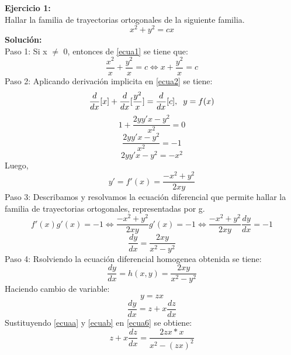 \documentclass[12pt,letterpaper]{article}
\begin{document}
\begin{titlepage}
\begin{flushleft}
\textbf{Ejercicio 1:} \\
\vspace{0.5cm}
Hallar la familia de trayectorias ortogonales de la siguiente familia. 
\begin{equation} \tag{1} \label{ecua1}
x^{2} + y^{2} = cx
\end{equation}
\textbf{Solución:} \\
\vspace{0.5cm}
 Paso 1: Si x $\neq$ 0, entonces de \eqref{ecua1} se tiene que:
\begin{equation} \tag{2} \label{ecua2}
\frac{x^{2}}{x} + \frac{y^{2}}{x} = c \Leftrightarrow x + \frac{y^{2}}{x} = c
\end{equation}
Paso 2: Aplicando derivación implicita en \eqref{ecua2} se tiene:
\begin{equation*} 
\dfrac{d}{dx} [x] + \dfrac{d}{dx} [\frac{y^{2}}{x}] = \dfrac{d}{dx} [c],\hspace{0.2cm} y = f(x)
\end{equation*}
\begin{equation*} 
1 + \frac{2yy'x - y^{2}}{x^{2}} = 0
\end{equation*}
\begin{equation*} 
 \frac{2yy'x - y^{2}}{x^{2}} = -1
\end{equation*}
\begin{equation} \tag{3} \label{ecua3}
 2yy'x - y^{2} = -x^{2}
\end{equation}
Luego,\\
\begin{equation} \tag{4} \label{ecua4}
y' = f'(x) = \dfrac{-x^{2} + y^{2}}{2xy}
\end{equation}
Paso 3: Describamos y resolvamos la ecuación diferencial que permite hallar la familia de trayectorias ortogonales, representadas por g.
\begin{equation*}
f'(x)g'(x) = -1 \Leftrightarrow \dfrac{-x^{2} + y^{2}}{2xy} g'(x)=-1 \Leftrightarrow \dfrac{-x^{2} + y^{2}}{2xy} \frac{dy}{dx} = -1 \tag{edh}
\end{equation*}
\begin{equation} \tag{5} \label{ecua5}
\frac{dy}{dx} = \dfrac{2xy}{x^{2} - y^{2}}
\end{equation}
Paso 4: Rsolviendo la ecuación diferencial homogenea obtenida se tiene:
\begin{equation}  \tag{6} \label{ecua6}
\frac{dy}{dx} = h(x,y)= \dfrac{2xy}{x^{2} - y^{2}}
\end{equation}
Haciendo cambio de variable:
\begin{equation}\tag{a} \label{ecuaa}
y = zx
\end{equation}
\begin{equation}\tag{b} \label{ecuab}
\frac{dy}{dx} = z + x \frac{dz}{dx}
\end{equation}
Sustituyendo \eqref{ecuaa} y \eqref{ecuab} en \eqref{ecua6} se obtiene:
\begin{equation*} \tag{edvs}
z + x \frac{dz}{dx} = \frac{2zx*x}{x^{2}- (zx)^{2}}
\end{equation*}
\end{flushleft}
\end{titlepage}
\end{document}
